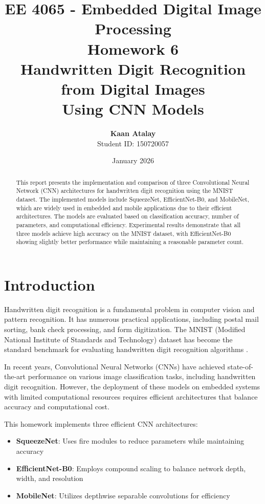 \documentclass[12pt,a4paper]{article}
\title{
    \vspace{-1cm}
    \textbf{EE 4065 - Embedded Digital Image Processing}\\
    \vspace{0.5cm}
    \Large Homework 6\\
    \vspace{0.3cm}
    \large Handwritten Digit Recognition from Digital Images\\
    \large Using CNN Models
}
\author{
    \textbf{Kaan Atalay}\\
    Student ID: 150720057
}
\date{January 2026}
\begin{document}
\maketitle

\begin{abstract}
This report presents the implementation and comparison of three Convolutional Neural Network (CNN) architectures for handwritten digit recognition using the MNIST dataset. The implemented models include SqueezeNet, EfficientNet-B0, and MobileNet, which are widely used in embedded and mobile applications due to their efficient architectures. The models are evaluated based on classification accuracy, number of parameters, and computational efficiency. Experimental results demonstrate that all three models achieve high accuracy on the MNIST dataset, with EfficientNet-B0 showing slightly better performance while maintaining a reasonable parameter count.
\end{abstract}

\tableofcontents
\newpage

\section{Introduction}

Handwritten digit recognition is a fundamental problem in computer vision and pattern recognition. It has numerous practical applications, including postal mail sorting, bank check processing, and form digitization. The MNIST (Modified National Institute of Standards and Technology) dataset has become the standard benchmark for evaluating handwritten digit recognition algorithms \cite{lecun1998}.

In recent years, Convolutional Neural Networks (CNNs) have achieved state-of-the-art performance on various image classification tasks, including handwritten digit recognition. However, the deployment of these models on embedded systems with limited computational resources requires efficient architectures that balance accuracy and computational cost.

This homework implements three efficient CNN architectures:
\begin{itemize}
    \item \textbf{SqueezeNet}: Uses fire modules to reduce parameters while maintaining accuracy
    \item \textbf{EfficientNet-B0}: Employs compound scaling to balance network depth, width, and resolution
    \item \textbf{MobileNet}: Utilizes depthwise separable convolutions for efficiency
\end{itemize}
\end{document}
